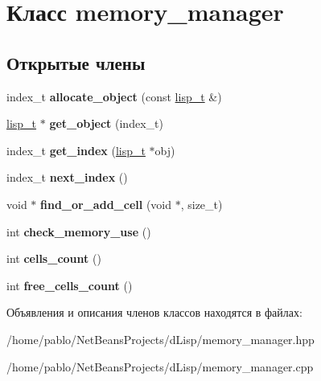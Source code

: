 \hypertarget{classmemory__manager}{}\section{Класс memory\+\_\+manager}
\label{classmemory__manager}
\subsection*{Открытые члены}
\begin{DoxyCompactItemize}
\item 
\mbox{\label{classmemory__manager_a05c8cf8b2eb3d8411f70acec0f2c1d15}} 
index\+\_\+t {\bfseries allocate\+\_\+object} (const \mbox{\hyperlink{structlisp__t}{lisp\+\_\+t}} \&)
\item 
\mbox{\label{classmemory__manager_a1da18ca2fca10dbac0f4ce98a697dc91}} 
\mbox{\hyperlink{structlisp__t}{lisp\+\_\+t}} $\ast$ {\bfseries get\+\_\+object} (index\+\_\+t)
\item 
\mbox{\label{classmemory__manager_a224b6bf9b6302d6ff08855531dc06be5}} 
index\+\_\+t {\bfseries get\+\_\+index} (\mbox{\hyperlink{structlisp__t}{lisp\+\_\+t}} $\ast$obj)
\item 
\mbox{\label{classmemory__manager_a106e0194f6016f5a9ff2953d16788cf3}} 
index\+\_\+t {\bfseries next\+\_\+index} ()
\item 
\mbox{\label{classmemory__manager_ae7472b4732ee8eb2d4af1aec8b973ac0}} 
void $\ast$ {\bfseries find\+\_\+or\+\_\+add\+\_\+cell} (void $\ast$, size\+\_\+t)
\item 
\mbox{\label{classmemory__manager_a616639b8ece6314ea8f9cbd5e3ff3dd0}} 
int {\bfseries check\+\_\+memory\+\_\+use} ()
\item 
\mbox{\label{classmemory__manager_ae054893d75db7f5042bc2401f06ee2e9}} 
int {\bfseries cells\+\_\+count} ()
\item 
\mbox{\label{classmemory__manager_a4fced86e5194cad808f70806d7b05417}} 
int {\bfseries free\+\_\+cells\+\_\+count} ()
\end{DoxyCompactItemize}


Объявления и описания членов классов находятся в файлах\+:\begin{DoxyCompactItemize}
\item 
/home/pablo/\+Net\+Beans\+Projects/d\+Lisp/memory\+\_\+manager.\+hpp\item 
/home/pablo/\+Net\+Beans\+Projects/d\+Lisp/memory\+\_\+manager.\+cpp\end{DoxyCompactItemize}
